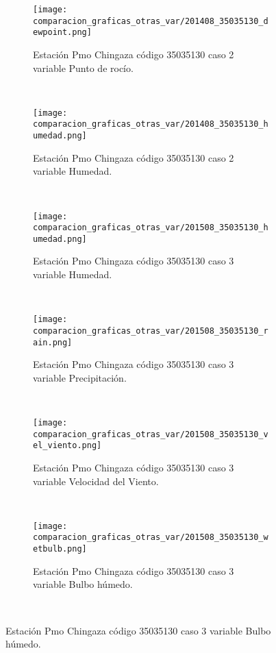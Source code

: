 \begin{figure}[H]
\centering
\begin{subfigure}[normla]{0.4\textwidth}
\caption{Estación Pmo Chingaza código 35035130 caso 2 variable Punto de rocío.}
\texttt{[image: comparacion\_graficas\_otras\_var/201408\_35035130\_dewpoint.png]}
\end{subfigure}
~
\begin{subfigure}[normla]{0.4\textwidth}
\caption{Estación Pmo Chingaza código 35035130 caso 2 variable Humedad.}
\texttt{[image: comparacion\_graficas\_otras\_var/201408\_35035130\_humedad.png]}
\end{subfigure}
~
\begin{subfigure}[normla]{0.4\textwidth}
\caption{Estación Pmo Chingaza código 35035130 caso 3 variable Humedad.}
\texttt{[image: comparacion\_graficas\_otras\_var/201508\_35035130\_humedad.png]}
\end{subfigure}
~
\begin{subfigure}[normla]{0.4\textwidth}
\caption{Estación Pmo Chingaza código 35035130 caso 3 variable Precipitación.}
\texttt{[image: comparacion\_graficas\_otras\_var/201508\_35035130\_rain.png]}
\end{subfigure}
~
\begin{subfigure}[normla]{0.4\textwidth}
\caption{Estación Pmo Chingaza código 35035130 caso 3 variable Velocidad del Viento.}
\texttt{[image: comparacion\_graficas\_otras\_var/201508\_35035130\_vel\_viento.png]}
\end{subfigure}
~
\begin{subfigure}[normla]{0.4\textwidth}
\caption{Estación Pmo Chingaza código 35035130 caso 3 variable Bulbo húmedo.}
\texttt{[image: comparacion\_graficas\_otras\_var/201508\_35035130\_wetbulb.png]}
\end{subfigure}
~
\end{figure}
           
